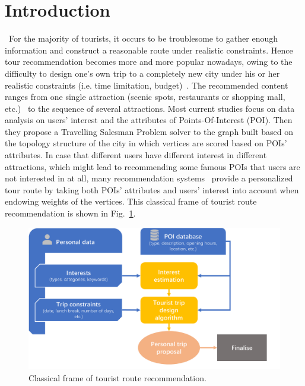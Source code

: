 \documentclass[runningheads]{llncs}
\begin{document}
\section{Introduction}
\quad\, For the majority of tourists, it occurs to be troublesome to gather enough information and construct a reasonable route under realistic constraints. Hence tour recommendation becomes more and more popular nowadays, owing to the difficulty to design one's own trip to a completely new city under his or her realistic constraints (i.e. time limitation, budget)~\cite{wang2018etour}. The recommended content ranges from one single attraction (scenic spots, restaurants or shopping mall, etc.)~\cite{10.1007/978-3-319-91452-7_5} to the sequence of several attractions. Most current studies\cite{Vansteenwegen2007} focus on data analysis on users' interest and the attributes of Points-Of-Interest (POI). Then they propose a Travelling Salesman Problem solver to the graph built based on the topology structure of the city in which vertices are scored based on POIs' attributes. In case that different users have different interest in different attractions, which might lead to recommending some famous POIs that users are not interested in at all, many recommendation systems~\cite{lim2015personalized} provide a personalized tour route by taking both POIs' attributes and users' interest into account when endowing weights of the vertices. This classical frame of tourist route recommendation is shown in Fig.~\ref{fig1}. 
\begin{figure}
	\includegraphics[width=\textwidth]{frame.pdf}
	\caption{Classical frame of tourist route recommendation.}\label{fig1}
\end{figure}
\end{document}
